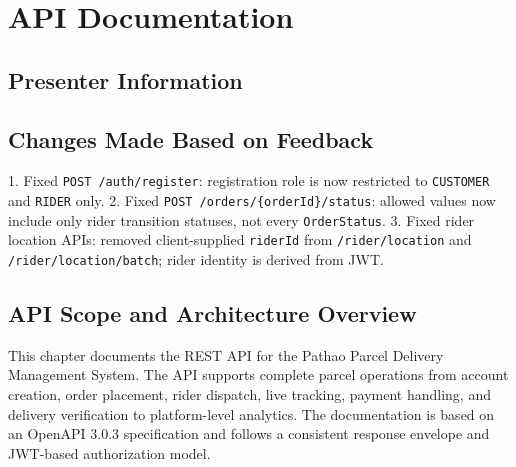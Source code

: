 
\chapter{API Documentation}



\section{Presenter Information}

\section{Changes Made Based on Feedback}
\feedback
{1. Fixed \texttt{POST /auth/register}: registration role is now restricted to \texttt{CUSTOMER} and \texttt{RIDER} only.}
{2. Fixed \texttt{POST /orders/\{orderId\}/status}: allowed values now include only rider transition statuses, not every \texttt{OrderStatus}.}
{3. Fixed rider location APIs: removed client-supplied \texttt{riderId} from \texttt{/rider/location} and \texttt{/rider/location/batch}; rider identity is derived from JWT.}

\section{API Scope and Architecture Overview}

This chapter documents the REST API for the Pathao Parcel Delivery Management
System. The API supports complete parcel operations from account creation,
order placement, rider dispatch, live tracking, payment handling, and delivery
verification to platform-level analytics. The documentation is based on an
OpenAPI 3.0.3 specification and follows a consistent response envelope and
JWT-based authorization model.

